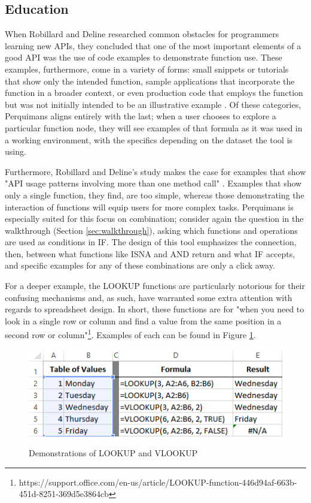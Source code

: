 \documentclass[conference]{IEEEtran}
\newcommand{\toolname}{Perquimans }
\begin{document}
	\subsection{Education} When Robillard and Deline researched common obstacles
	for programmers learning new APIs, they concluded that one of the most
	important elements of a good API was the use of code examples to demonstrate
	function use. These examples, furthermore, come in a variety of forms: small
	snippets or tutorials that show only the intended function, sample applications
	that incorporate the function in a broader context, or even production code
	that employs the function but was not initially intended to be an illustrative
	example \cite{robillard2011field}. Of these categories, \toolname aligns
	entirely with the last; when a user chooses to explore a particular function
	node, they will see examples of that formula as it was used in a working
	environment, with the specifics depending on the dataset the tool is using.
	\par
	
	Furthermore, Robillard and Deline's study makes the case for examples that show
	"API usage patterns involving more than one method call"
	\cite{robillard2011field}. Examples that show only a single function, they
	find, are too simple, whereas those demonstrating the interaction of functions
	will equip users for more complex tasks. \toolname is especially suited for
	this focus on combination; consider again the question in the walkthrough
	(Section \ref{sec:walkthrough}), asking which functions and operations are used
	as conditions in IF. The design of this tool emphasizes the connection, then,
	between what functions like ISNA and AND return and what IF accepts, and
	specific examples for any of these combinations are only a click away.
	
	For a deeper example, the LOOKUP functions are particularly notorious for their
	confusing mechanisms and, as such, have warranted some extra attention with
	regards to spreadsheet design. In short, these functions are for "when you need
	to look in a single row or column and find a value from the same position in a
	second row or
	column"\footnote{https://support.office.com/en-us/article/LOOKUP-function-446d94af-663b-451d-8251-369d5e3864cb}. Examples of each can be found in Figure \ref{fig:lookupexample}.
	
	\begin{figure} \centering \includegraphics[width=.5\textwidth]{lookupexample}
		\label{fig:lookupexample} \caption{Demonstrations of LOOKUP and VLOOKUP}
	\end{figure}
	
\end{document}

